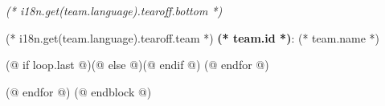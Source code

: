             \begin{minipage}[t][90mm][t]{\textwidth}%
                \begin{minipage}[t][88mm][t]{0.85\linewidth}%
                    \centering
                    \vspace*{37mm}
                    \LARGE
                    \textit{(* i18n.get(team.language).tearoff.bottom *)}
                \end{minipage}%
                \begin{minipage}[t][88mm][t]{0.15\linewidth}
                    \vspace{0mm}%
                    \hspace{4mm}%
                    \hspace{2pt}
                \end{minipage}
                {\small (* i18n.get(team.language).tearoff.team *) \textbf{(* team.id *)}: (* team.name *)}
            \end{minipage}%
            (@ if loop.last @)\newpage(@ else @)\vspace*{-1mm}(@ endif @)
        (@ endfor @)

    (@ endfor @)
(@ endblock @)
